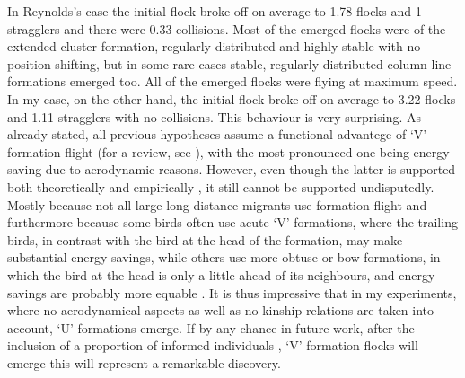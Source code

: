 In Reynolds's case the initial flock broke off on average to 1.78 flocks and 1 stragglers and there were 0.33 collisions. Most of the emerged flocks were of the extended cluster formation, regularly distributed and highly stable with no position shifting, but in some rare cases stable, regularly distributed column line formations emerged too. All of the emerged flocks were flying at maximum speed. In my case, on the other hand, the initial flock broke off on average to 3.22 flocks and 1.11 stragglers with no collisions.  This behaviour is very surprising. As already stated, all previous hypotheses assume a functional advantege of `V' formation flight (for a review, see \cite{heppner:1997,speakman:1998}), with the most pronounced one being energy saving due to aerodynamic reasons. However, even though the latter is supported both theoretically and empirically \cite{badgerow:1981,badgerow:1988,hainsworth:1987,hainsworth:1989,lissaman:1970,speakman:1998}, it still cannot be supported undisputedly. Mostly because not all large long-distance migrants use formation flight and furthermore because some birds often use acute `V' formations, where the trailing birds, in contrast with the bird at the head of the formation, may make substantial energy savings, while others use more obtuse or bow formations, in which the bird at the head is only a little ahead of its neighbours, and energy savings are probably more equable \cite{andersson:2004}. It is thus impressive that in my experiments, where no aerodynamical aspects as well as no kinship relations \cite{andersson:2004} are taken into account, `U' formations emerge. If by any chance in future work, after the inclusion of a proportion of informed individuals \cite{couzin:2005}, `V' formation flocks will emerge this will represent a remarkable discovery.

